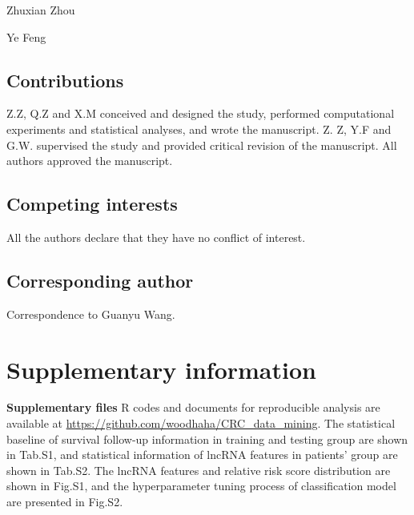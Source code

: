 \documentclass[fleqn,10pt]{wlscirep}
\begin{document}
   Zhuxian Zhou

   Ye Feng

\subsection*{Contributions}
Z.Z, Q.Z and X.M conceived and designed the study, performed computational experiments and statistical analyses, and wrote the manuscript. Z. Z, Y.F and G.W. supervised the study and provided critical revision of the manuscript. All authors approved the manuscript.
\subsection*{Competing interests}
All the authors declare that they have no conflict of interest.

\subsection*{Corresponding author}
Correspondence to Guanyu Wang.
\section*{Supplementary information}

\textbf{Supplementary files}
R codes and documents for reproducible analysis are available at \url{https://github.com/woodhaha/CRC_data_mining}.
The statistical baseline of survival follow-up information in training and testing group are shown in Tab.S1, and statistical information of lncRNA features in patients' group are shown in Tab.S2. The  lncRNA features and relative risk score distribution  are shown in Fig.S1, and the hyperparameter tuning process of classification model are presented in Fig.S2.
\end{document}
